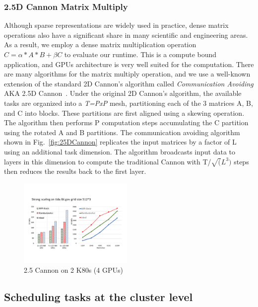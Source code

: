 \subsubsection{2.5D Cannon Matrix Multiply}
Although sparse representations are widely used in practice, dense matrix operations also have a significant share in many scientific and engineering areas.
As a result, we employ a dense matrix multiplication operation $C = \alpha* A * B + \beta C$ to evaluate our runtime.
This is a compute bound application, and GPUs architecture is very well suited for the computation. 
There are many algorithms for the matrix multiply operation, and we use a well-known extension of the standard 2D Cannon's algorithm called {\em Communication Avoiding} AKA 2.5D Cannon~\cite{25Dcannon}. 
Under the original 2D Cannon's algorithm, the available tasks are organized into a {\em T=PxP} mesh, partitioning each of the 3 matrices A, B, and C into blocks.
These partitions are first aligned using a skewing operation.
The algorithm then performs P computation steps accumulating the C partition using the rotated A and B partitions.
The communication avoiding algorithm shown in Fig.~\ref{fig:25DCannon} replicates the input matrices by a factor of L using an additional task dimension.
The algorithm broadcasts input data to layers in this dimension to compute the traditional Cannon with T/$\sqrt(L^3)$ steps then reduces the results back to the first layer.



\begin{figure}[htb]
\centering
\includegraphics[width=0.49\textwidth]{figures/cannon_tida.pdf}
\caption{2.5 Cannon on 2 K80s (4 GPUs)}
\label{cannin_onnode}
\end{figure}




\subsection{Scheduling tasks at the cluster level}

